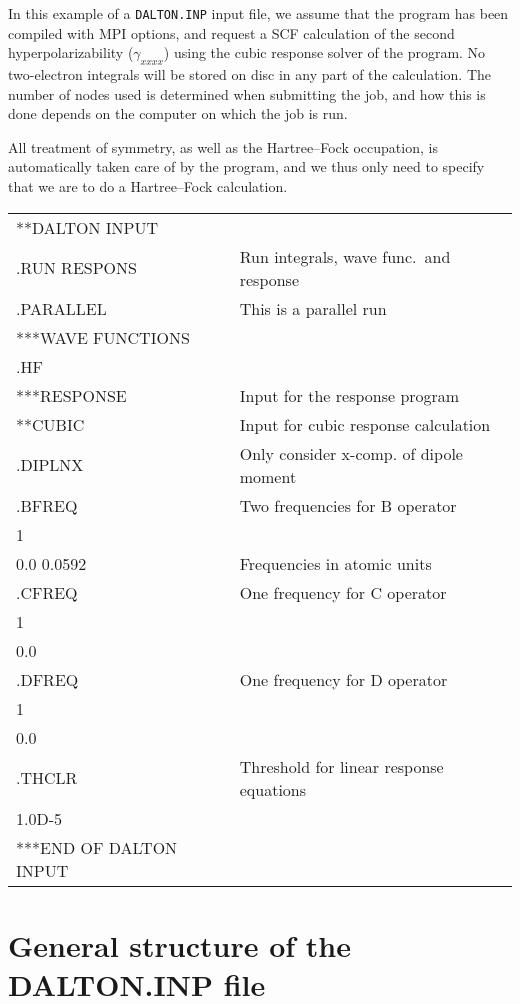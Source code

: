 In this example of a \verb|DALTON.INP| input file, we assume that
the program has been compiled with MPI options, and request a SCF
calculation of the second
hyperpolarizability
($\gamma_{xxxx}$) using
the cubic response solver
of the {\resp} program. No two-electron
integrals will be stored on disc in any part of the calculation. The
number of nodes used is determined when submitting the
job, and how
this is done depends on the computer on which the job is run.

All treatment  of symmetry, as well as the Hartree--Fock
occupation, is
automatically taken care of by the program, and we thus only need to
specify that we are to do a Hartree--Fock calculation.

{\ttfamily
\begin{tabular}{ll}
**DALTON INPUT\\
.RUN RESPONS\hspace{2.5cm} & Run integrals, wave func.\ and response\\
.PARALLEL & This is a parallel run\\
***WAVE FUNCTIONS\\
.HF\\
***RESPONSE & Input for the response program\\
**CUBIC & Input for cubic response calculation\\
.DIPLNX & Only consider x-comp. of dipole moment\\
.BFREQ & Two frequencies for B operator\\
 1\\
 0.0 0.0592& Frequencies in atomic units\\
.CFREQ & One frequency for C operator\\
 1\\
 0.0\\
.DFREQ & One frequency for D operator\\
 1\\
 0.0\\
.THCLR & Threshold for linear response equations\\
 1.0D-5\\
***END OF DALTON INPUT\\
\end{tabular}}

\section{General structure of the DALTON.INP file}\label{sec:inputstructure}

